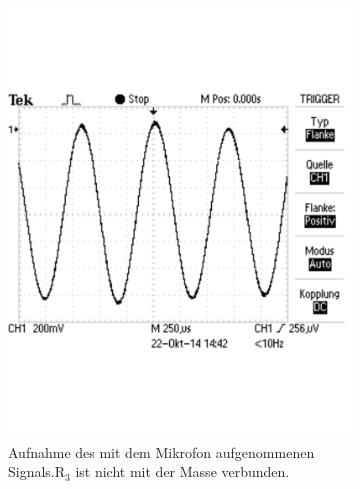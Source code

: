 \documentclass[12pt,a4paper]{article}
\begin{document}
\begin{figure}[H]
        \centering
        \begin{subfigure}[tb]{0.48\textwidth}
                \includegraphics[width=\textwidth , scale = 0.4]{2_3_r3np_sig.pdf}
				\caption[Aufnahme des mit dem Mikrofon aufgenommenen Signals. R$_3$ ist nicht mit der Masse verbunden.]{Aufnahme des mit dem Mikrofon aufgenommenen Signals.R$_3$ ist nicht mit der Masse verbunden.}
  				\label{fig:2_3_r3np_sig}
        \end{subfigure}
        \hfill
        \begin{subfigure}[tb]{0.48\textwidth}

\end{subfigure}
\end{figure}
\end{document}
